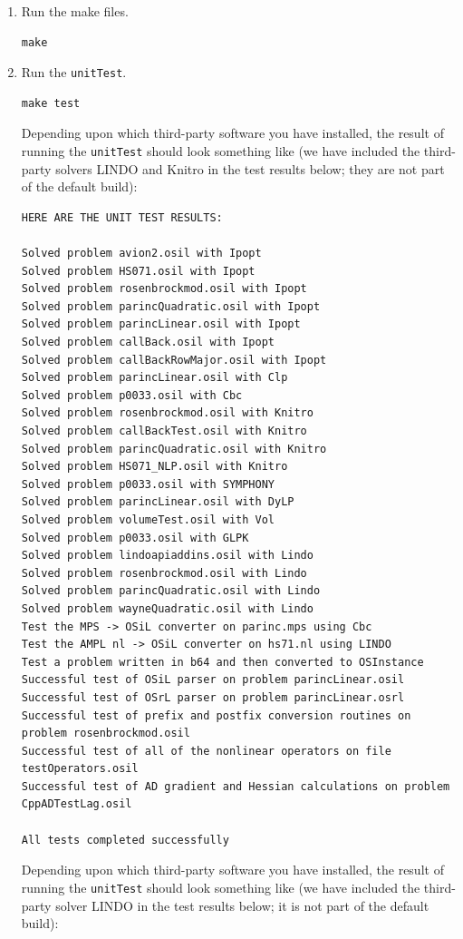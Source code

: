 \documentclass[11pt]{article}
\renewcommand{\_}{{\char"5F}}
\renewcommand{\{}{{\char"7B}}
\renewcommand{\}}{{\char"7D}}
\renewcommand{\^}{{\char"0D}}
\renewcommand{\'}{{\char"0D}}
\newif\ifknitro \knitrofalse    %
\begin{document}
\begin{enumerate}[{\bf Step 1:}]
\item{}  Run the make files.

\begin{verbatim}
make
\end{verbatim}

\item{} Run the {\tt unitTest}.

\begin{verbatim}
make test
\end{verbatim}

\ifknitro
Depending upon which third-party software you have installed, the result of running the {\tt unitTest} should look 
something like (we have included the third-party solvers LINDO and Knitro in the test results below; they are not 
part of the default build):


{\small
\begin{verbatim}
HERE ARE THE UNIT TEST RESULTS:

Solved problem avion2.osil with Ipopt
Solved problem HS071.osil with Ipopt
Solved problem rosenbrockmod.osil with Ipopt
Solved problem parincQuadratic.osil with Ipopt
Solved problem parincLinear.osil with Ipopt
Solved problem callBack.osil with Ipopt
Solved problem callBackRowMajor.osil with Ipopt
Solved problem parincLinear.osil with Clp
Solved problem p0033.osil with Cbc
Solved problem rosenbrockmod.osil with Knitro
Solved problem callBackTest.osil with Knitro
Solved problem parincQuadratic.osil with Knitro
Solved problem HS071_NLP.osil with Knitro
Solved problem p0033.osil with SYMPHONY
Solved problem parincLinear.osil with DyLP
Solved problem volumeTest.osil with Vol
Solved problem p0033.osil with GLPK
Solved problem lindoapiaddins.osil with Lindo
Solved problem rosenbrockmod.osil with Lindo
Solved problem parincQuadratic.osil with Lindo
Solved problem wayneQuadratic.osil with Lindo
Test the MPS -> OSiL converter on parinc.mps using Cbc
Test the AMPL nl -> OSiL converter on hs71.nl using LINDO
Test a problem written in b64 and then converted to OSInstance
Successful test of OSiL parser on problem parincLinear.osil
Successful test of OSrL parser on problem parincLinear.osrl
Successful test of prefix and postfix conversion routines on problem rosenbrockmod.osil
Successful test of all of the nonlinear operators on file testOperators.osil
Successful test of AD gradient and Hessian calculations on problem CppADTestLag.osil

All tests completed successfully
\end{verbatim}
}
\else
Depending upon which third-party software you have installed, the result of running the {\tt unitTest} should look 
something like (we have included the third-party solver LINDO in the test results below; it is not 
part of the default build):



\end{enumerate}
\end{document}
